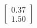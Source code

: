 \documentclass[preview]{standalone}
\begin{document}
\begin{align*}
\begin{bmatrix} 0.37 \\ 1.50 \end{bmatrix}
\end{align*}
\end{document}
